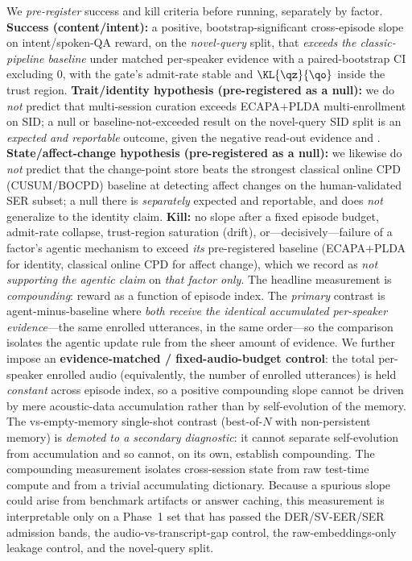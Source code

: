 We \emph{pre-register} success and kill criteria before running, separately by factor. \textbf{Success (content/intent):} a positive, bootstrap-significant cross-episode slope on intent/spoken-QA reward, on the \emph{novel-query} split, that \emph{exceeds the classic-pipeline baseline} under matched per-speaker evidence with a paired-bootstrap CI excluding $0$, with the gate's admit-rate stable and $\KL{\qz}{\qo}$ inside the trust region. \textbf{Trait/identity hypothesis (pre-registered as a null):} we do \emph{not} predict that multi-session curation exceeds ECAPA$+$PLDA multi-enrollment on SID; a null or baseline-not-exceeded result on the novel-query SID split is an \emph{expected and reportable} outcome, given the negative read-out evidence and . \textbf{State/affect-change hypothesis (pre-registered as a null):} we likewise do \emph{not} predict that the change-point store beats the strongest classical online CPD (CUSUM/BOCPD) baseline at detecting affect changes on the human-validated SER subset; a null there is \emph{separately} expected and reportable, and does \emph{not} generalize to the identity claim. \textbf{Kill:} no slope after a fixed episode budget, admit-rate collapse, trust-region saturation (drift), or---decisively---failure of a factor's agentic mechanism to exceed \emph{its} pre-registered baseline (ECAPA$+$PLDA for identity, classical online CPD for affect change), which we record as \emph{not supporting the agentic claim} on \emph{that factor only}. The headline measurement is \emph{compounding}: reward as a function of episode index. The \emph{primary} contrast is agent-minus-baseline where \emph{both receive the identical accumulated per-speaker evidence}---the same enrolled utterances, in the same order---so the comparison isolates the agentic update rule from the sheer amount of evidence. We further impose an \textbf{evidence-matched / fixed-audio-budget control}: the total per-speaker enrolled audio (equivalently, the number of enrolled utterances) is held \emph{constant} across episode index, so a positive compounding slope cannot be driven by mere acoustic-data accumulation rather than by self-evolution of the memory. The vs-empty-memory single-shot contrast (best-of-$N$ with non-persistent memory) is \emph{demoted to a secondary diagnostic}: it cannot separate self-evolution from accumulation and so cannot, on its own, establish compounding. The compounding measurement isolates cross-session state from raw test-time compute \citep{snell2024ttscompute,zuo2025ttrl} and from a trivial accumulating dictionary. Because a spurious slope could arise from benchmark artifacts or answer caching, this measurement is interpretable only on a Phase~1 set that has passed the DER/SV-EER/SER admission bands, the audio-vs-transcript-gap control, the raw-embeddings-only leakage control, and the novel-query split.

